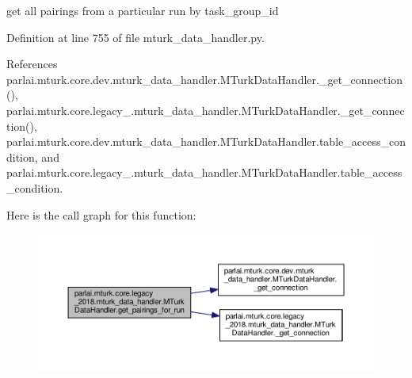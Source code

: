\begin{DoxyVerb}get all pairings from a particular run by task_group_id\end{DoxyVerb}
 

Definition at line 755 of file mturk\+\_\+data\+\_\+handler.\+py.



References parlai.\+mturk.\+core.\+dev.\+mturk\+\_\+data\+\_\+handler.\+M\+Turk\+Data\+Handler.\+\_\+get\+\_\+connection(), parlai.\+mturk.\+core.\+legacy\+\_.\+mturk\+\_\+data\+\_\+handler.\+M\+Turk\+Data\+Handler.\+\_\+get\+\_\+connection(), parlai.\+mturk.\+core.\+dev.\+mturk\+\_\+data\+\_\+handler.\+M\+Turk\+Data\+Handler.\+table\+\_\+access\+\_\+condition, and parlai.\+mturk.\+core.\+legacy\+\_.\+mturk\+\_\+data\+\_\+handler.\+M\+Turk\+Data\+Handler.\+table\+\_\+access\+\_\+condition.

Here is the call graph for this function\+:
\nopagebreak
\begin{figure}[H]
\begin{center}
\leavevmode
\includegraphics[width=350pt]{classparlai_1_1mturk_1_1core_1_1legacy__2018_1_1mturk__data__handler_1_1MTurkDataHandler_acdb06b52aa67442098fc2856deee1ce7_cgraph}
\end{center}
\end{figure}
\mbox{\label{classparlai_1_1mturk_1_1core_1_1legacy__2018_1_1mturk__data__handler_1_1MTurkDataHandler_a9f03e4f7a133dfa1d22df886a303d339}} 

